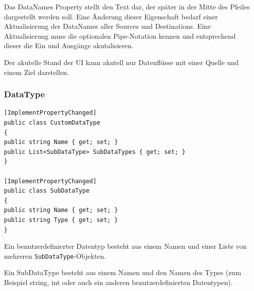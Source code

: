 Das DataNames Property stellt den Text dar, der später in der Mitte des
Pfeiles dargestellt werden soll. Eine Änderung dieser Eigenschaft bedarf
einer Aktualisierung der DataNames aller Sources und Destinations.
Eine Aktualisierung muss die optionalen Pipe-Notation kennen und
entsprechend dieser die Ein und Ausgänge akutalisieren.

Der akutelle Stand der UI kann akutell nur Datenflüsse mit einer Quelle und
einem Ziel darstellen.

\subsubsection{DataType}
\label{sec:orgheadline10}

\begin{verbatim}
[ImplementPropertyChanged]
public class CustomDataType
{
public string Name { get; set; }
public List<SubDataType> SubDataTypes { get; set; }
}

[ImplementPropertyChanged]
public class SubDataType
{
public string Name { get; set; }
public string Type { get; set; }
}
\end{verbatim}

Ein benutzerdefinierter Datentyp besteht aus einem Namen und einer Liste von mehreren
\texttt{SubDataType}-Objekten. 

Ein SubDataType besteht aus einem Namen und den Namen
des Types (zum Beispiel string, int oder auch ein anderen benutzerdefinierten
Datentypen).

